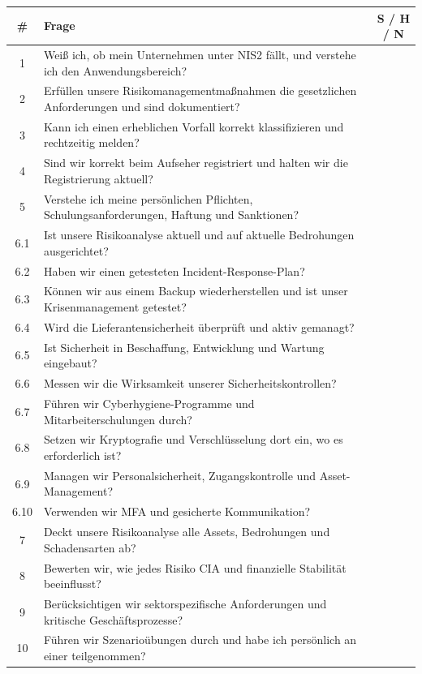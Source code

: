 \documentclass[11pt,a4paper,twoside]{book}
\begin{document}
\begin{center}
\renewcommand{\arraystretch}{1.4}
\begin{tabularx}{\linewidth}{@{}cXc@{}}
\toprule
\textbf{\#} & \textbf{Frage} & \textbf{S / H / N} \\
\midrule
1 & Weiß ich, ob mein Unternehmen unter NIS2 fällt, und verstehe ich den Anwendungsbereich? & \\
2 & Erfüllen unsere Risikomanagementmaßnahmen die gesetzlichen Anforderungen und sind dokumentiert? & \\
3 & Kann ich einen erheblichen Vorfall korrekt klassifizieren und rechtzeitig melden? & \\
4 & Sind wir korrekt beim Aufseher registriert und halten wir die Registrierung aktuell? & \\
5 & Verstehe ich meine persönlichen Pflichten, Schulungsanforderungen, Haftung und Sanktionen? & \\
6.1 & Ist unsere Risikoanalyse aktuell und auf aktuelle Bedrohungen ausgerichtet? & \\
6.2 & Haben wir einen getesteten Incident-Response-Plan? & \\
6.3 & Können wir aus einem Backup wiederherstellen und ist unser Krisenmanagement getestet? & \\
6.4 & Wird die Lieferantensicherheit überprüft und aktiv gemanagt? & \\
6.5 & Ist Sicherheit in Beschaffung, Entwicklung und Wartung eingebaut? & \\
6.6 & Messen wir die Wirksamkeit unserer Sicherheitskontrollen? & \\
6.7 & Führen wir Cyberhygiene-Programme und Mitarbeiterschulungen durch? & \\
6.8 & Setzen wir Kryptografie und Verschlüsselung dort ein, wo es erforderlich ist? & \\
6.9 & Managen wir Personalsicherheit, Zugangskontrolle und Asset-Management? & \\
6.10 & Verwenden wir MFA und gesicherte Kommunikation? & \\
7 & Deckt unsere Risikoanalyse alle Assets, Bedrohungen und Schadensarten ab? & \\
8 & Bewerten wir, wie jedes Risiko CIA und finanzielle Stabilität beeinflusst? & \\
9 & Berücksichtigen wir sektorspezifische Anforderungen und kritische Geschäftsprozesse? & \\
10 & Führen wir Szenarioübungen durch und habe ich persönlich an einer teilgenommen? & \\
\bottomrule
\end{tabularx}
\end{center}
\end{document}

